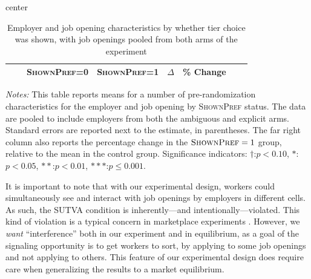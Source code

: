 \documentclass[12pt]{article}
\newcommand{\starlanguage}{Significance indicators: $\dagger$:$p < 0.10$, $*$:$p < 0.05$, $**$:$p < 0.01$, $***$:$p \le 0.001$.}
\begin{document}
\begin{table}
\begin{center}
\caption{Employer and job opening characteristics by whether tier choice was shown, with job openings pooled from both arms of the experiment}
\label{tab:balance_big}
\begin{small}
\begin{adjustbox}{center}
\begin{tabular}{lllccccc}
\toprule
&   & \multicolumn{1}{c}{\parbox[t][][t]{2.3cm}{{\footnotesize \textsc{ShownPref}=0}}}
&     \multicolumn{1}{c}{\parbox[t][][t]{2.3cm}{\footnotesize  \textsc{ShownPref=1}}}
&     \multicolumn{1}{c}{\parbox[t][][t]{2.0cm}{$\Delta$}}
&     \multicolumn{1}{c}{\parbox[t][][t]{1cm}{\% Change}}
\\
\hline

  

\bottomrule
\end{tabular}
\end{adjustbox}
\end{small}
\end{center}
\begin{minipage}{1.0 \textwidth}
\begin{footnotesize}
\begin{singlespace}
  \emph{Notes:} This table reports means for a number of pre-randomization characteristics for the employer and job opening by \textsc{ShownPref} status.
  The data are pooled to include employers from both the ambiguous and explicit arms.
Standard errors are reported next to the estimate, in parentheses.
The far right column also reports the percentage change in the $\textsc{ShownPref}=1$ group, relative to the mean in the control group. 
\starlanguage
\end{singlespace}
\end{footnotesize}
\end{minipage}
\end{table}

It is important to note that with our experimental design, workers could simultaneously see and interact with job openings by employers in different cells. 
As such, the SUTVA condition is inherently---and intentionally---violated.
This kind of violation is a typical concern in marketplace experiments \citep{blake2014marketplace}.
However, we \emph{want} ``interference'' both in our experiment and in equilibrium, as a goal of the signaling opportunity is to get workers to sort, by applying to some job openings and not applying to others.
This feature of our experimental design does require care when generalizing the results to a market equilibrium.
\end{document}
